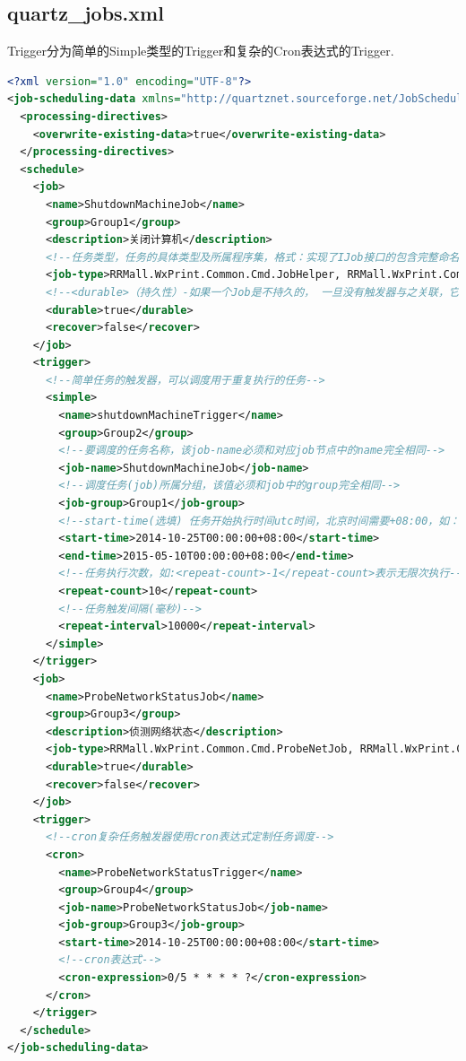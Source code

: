 \documentclass{book}
\begin{document}
\subsection{quartz\_jobs.xml}

Trigger分为简单的Simple类型的Trigger和复杂的Cron表达式的Trigger.

\begin{lstlisting}[language=XML]
<?xml version="1.0" encoding="UTF-8"?>
<job-scheduling-data xmlns="http://quartznet.sourceforge.net/JobSchedulingData" xmlns:xsi="http://www.w3.org/2001/XMLSchema-instance" version="2.0">
  <processing-directives>
    <overwrite-existing-data>true</overwrite-existing-data>
  </processing-directives>
  <schedule>
    <job>
      <name>ShutdownMachineJob</name>
      <group>Group1</group>
      <description>关闭计算机</description>
      <!--任务类型，任务的具体类型及所属程序集，格式：实现了IJob接口的包含完整命名空间的类名,程序集名称-->
      <job-type>RRMall.WxPrint.Common.Cmd.JobHelper, RRMall.WxPrint.Common</job-type>
      <!--<durable>（持久性）-如果一个Job是不持久的， 一旦没有触发器与之关联，它就会被从scheduler 中自动删除-->
      <durable>true</durable>
      <recover>false</recover>
    </job>
    <trigger>
      <!--简单任务的触发器，可以调度用于重复执行的任务-->
      <simple>
        <name>shutdownMachineTrigger</name>
        <group>Group2</group>
        <!--要调度的任务名称，该job-name必须和对应job节点中的name完全相同-->
        <job-name>ShutdownMachineJob</job-name>
        <!--调度任务(job)所属分组，该值必须和job中的group完全相同-->
        <job-group>Group1</job-group>
        <!--start-time(选填) 任务开始执行时间utc时间，北京时间需要+08:00，如：<start-time>2012-04-01T08:00:00+08:00</start-time>表示北京时间2012年4月1日上午8:00开始执行，注意服务启动或重启时都会检测此属性，若没有设置此属性或者start-time设置的时间比当前时间较早，则服务启动后会立即执行一次调度，若设置的时间比当前时间晚，服务会等到设置时间相同后才会第一次执行任务，一般若无特殊需要请不要设置此属性-->
        <start-time>2014-10-25T00:00:00+08:00</start-time>
        <end-time>2015-05-10T00:00:00+08:00</end-time>
        <!--任务执行次数，如:<repeat-count>-1</repeat-count>表示无限次执行-->
        <repeat-count>10</repeat-count>
        <!--任务触发间隔(毫秒)-->
        <repeat-interval>10000</repeat-interval>
      </simple>
    </trigger>
    <job>
      <name>ProbeNetworkStatusJob</name>
      <group>Group3</group>
      <description>侦测网络状态</description>      
      <job-type>RRMall.WxPrint.Common.Cmd.ProbeNetJob, RRMall.WxPrint.Common</job-type>
      <durable>true</durable>
      <recover>false</recover>      
    </job>
    <trigger>
      <!--cron复杂任务触发器使用cron表达式定制任务调度-->
      <cron>
        <name>ProbeNetworkStatusTrigger</name>
        <group>Group4</group>
        <job-name>ProbeNetworkStatusJob</job-name>
        <job-group>Group3</job-group>
        <start-time>2014-10-25T00:00:00+08:00</start-time>
        <!--cron表达式-->
        <cron-expression>0/5 * * * * ?</cron-expression>
      </cron>
    </trigger>
  </schedule>
</job-scheduling-data>
\end{lstlisting}
\end{document}
